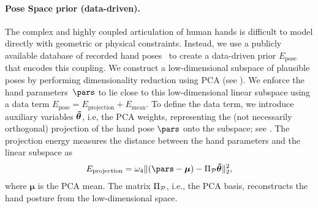 \paragraph*{Pose Space prior (data-driven).}


The complex and highly coupled articulation of human hands is difficult to model directly with geometric or physical constraints. Instead, we use a publicly available database of recorded hand poses~\cite{schroeder_icra14} to create a data-driven prior $E_{\text{pose}}$ that encodes this coupling.
We construct a low-dimensional subspace of plausible poses by performing dimensionality reduction using PCA (see ). 
% 
%
We enforce the hand parameters~$\pars$ to lie close to this low-dimensional linear subspace using a 
 data term
$E_{\text{pose}} = E_{\text{projection}} + E_{\text{mean}}$.
%
To define the data term, we introduce auxiliary variables $\boldsymbol{\tilde\theta}$, i.e, the PCA weights, representing the (not necessarily orthogonal) projection of the hand pose $\pars$ onto the subspace; see .
The projection energy  measures the distance between the hand parameters and the linear subspace as
% 
\begin{eqnarray}
E_{\text{projection}}  = \omegapcaproj \|(\pars - \boldsymbol{\mu}) - \proj_\posespace \parssub \|_2^2,   
\label{eq:pcaproj}
\end{eqnarray}
% 
where $\boldsymbol{\mu}$ is the PCA mean. The matrix $\Pi_{\mathcal{P}}$, i.e., the PCA basis,
reconstructs the hand posture from the low-dimensional space. 
